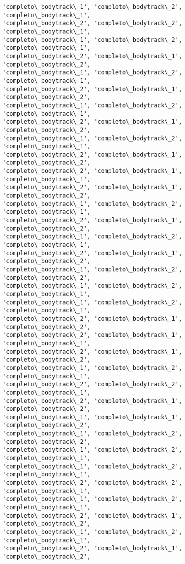 \documentclass[11pt]{article}
\begin{document}
\begin{Verbatim}[commandchars=\\\{\}]
'completo\_bodytrack\_1', 'completo\_bodytrack\_2', 'completo\_bodytrack\_1',
'completo\_bodytrack\_2', 'completo\_bodytrack\_2', 'completo\_bodytrack\_1',
'completo\_bodytrack\_1', 'completo\_bodytrack\_2', 'completo\_bodytrack\_1',
'completo\_bodytrack\_2', 'completo\_bodytrack\_1', 'completo\_bodytrack\_2',
'completo\_bodytrack\_1', 'completo\_bodytrack\_2', 'completo\_bodytrack\_1',
'completo\_bodytrack\_2', 'completo\_bodytrack\_1', 'completo\_bodytrack\_2',
'completo\_bodytrack\_1', 'completo\_bodytrack\_2', 'completo\_bodytrack\_1',
'completo\_bodytrack\_2', 'completo\_bodytrack\_1', 'completo\_bodytrack\_2',
'completo\_bodytrack\_1', 'completo\_bodytrack\_2', 'completo\_bodytrack\_1',
'completo\_bodytrack\_2', 'completo\_bodytrack\_1', 'completo\_bodytrack\_2',
'completo\_bodytrack\_2', 'completo\_bodytrack\_1', 'completo\_bodytrack\_1',
'completo\_bodytrack\_2', 'completo\_bodytrack\_1', 'completo\_bodytrack\_2',
'completo\_bodytrack\_1', 'completo\_bodytrack\_2', 'completo\_bodytrack\_1',
'completo\_bodytrack\_2', 'completo\_bodytrack\_1', 'completo\_bodytrack\_2',
'completo\_bodytrack\_1', 'completo\_bodytrack\_2', 'completo\_bodytrack\_1',
'completo\_bodytrack\_2', 'completo\_bodytrack\_1', 'completo\_bodytrack\_2',
'completo\_bodytrack\_1', 'completo\_bodytrack\_2', 'completo\_bodytrack\_2',
'completo\_bodytrack\_1', 'completo\_bodytrack\_2', 'completo\_bodytrack\_1',
'completo\_bodytrack\_1', 'completo\_bodytrack\_2', 'completo\_bodytrack\_1',
'completo\_bodytrack\_2', 'completo\_bodytrack\_1', 'completo\_bodytrack\_2',
'completo\_bodytrack\_2', 'completo\_bodytrack\_1', 'completo\_bodytrack\_1',
'completo\_bodytrack\_2', 'completo\_bodytrack\_1', 'completo\_bodytrack\_2',
'completo\_bodytrack\_1', 'completo\_bodytrack\_2', 'completo\_bodytrack\_1',
'completo\_bodytrack\_2', 'completo\_bodytrack\_2', 'completo\_bodytrack\_1',
'completo\_bodytrack\_2', 'completo\_bodytrack\_1', 'completo\_bodytrack\_2',
'completo\_bodytrack\_1', 'completo\_bodytrack\_1', 'completo\_bodytrack\_2',
'completo\_bodytrack\_1', 'completo\_bodytrack\_2', 'completo\_bodytrack\_2',
'completo\_bodytrack\_1', 'completo\_bodytrack\_2', 'completo\_bodytrack\_1',
'completo\_bodytrack\_1', 'completo\_bodytrack\_2', 'completo\_bodytrack\_1',
'completo\_bodytrack\_2', 'completo\_bodytrack\_2', 'completo\_bodytrack\_1',
'completo\_bodytrack\_1', 'completo\_bodytrack\_2', 'completo\_bodytrack\_1',
'completo\_bodytrack\_2', 'completo\_bodytrack\_1', 'completo\_bodytrack\_2',
'completo\_bodytrack\_1', 'completo\_bodytrack\_2', 'completo\_bodytrack\_1',
'completo\_bodytrack\_2', 'completo\_bodytrack\_1', 'completo\_bodytrack\_2',

\end{Verbatim}
\end{document}
